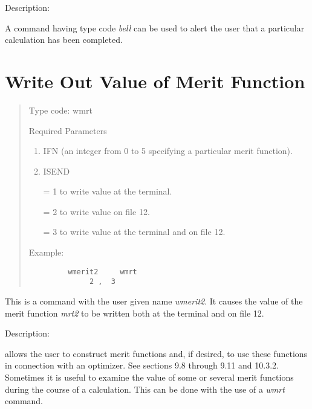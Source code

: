 \vspace{5mm}
     Description:
\vspace{2mm}

A command having type code {\em bell} can be used to alert the \Mary user
that a particular calculation has been completed.

\newpage
\section{Write Out Value of Merit Function}
\begin{quotation}
\noindent Type code:  wmrt
\vspace{5mm}

\noindent Required Parameters
\begin{enumerate}
       \item  IFN (an integer from 0 to 5 specifying a particular merit
              function).

       \item  ISEND

              = 1 to write value at the terminal.

              = 2 to write value on file 12.

              = 3 to write value at the terminal and on file 12.
\end{enumerate}

\vspace{5mm}
\noindent     Example:
\begin{verbatim}
         wmerit2     wmrt
              2 ,  3
\end{verbatim}
\end{quotation}

This is a command with the user given name {\em wmerit2}.  It causes the value of the merit function {\em mrt2} to be written both at the terminal and on file 12.

\vspace{5mm}
     Description:
\vspace{2mm}

\Mary allows the user to construct merit functions and, if desired, to use these functions in connection with an optimizer.  See sections 9.8 through 9.11 and 10.3.2.  Sometimes it is useful to examine the value of some or several merit functions during the course of a \Mary calculation.  This can be done with the use of a {\em wmrt} command.

\newpage
